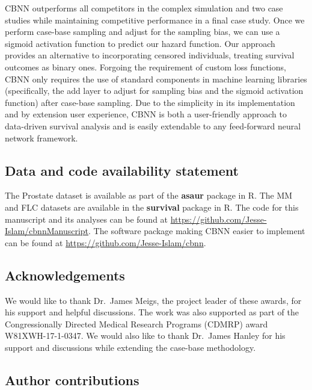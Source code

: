 \documentclass[APA,LATO1COL]{WileyNJD-v2}
\begin{document}
CBNN outperforms all competitors in the complex
simulation and two case studies while maintaining competitive performance in a final case study.
Once we perform case-base sampling and adjust for the sampling bias, we can use
a sigmoid activation function to predict our hazard function. Our
approach provides an alternative to incorporating censored individuals, treating
survival outcomes as binary ones. Forgoing the requirement
of custom loss functions, CBNN only requires the use of standard
components in machine learning libraries (specifically, the add layer to
adjust for sampling bias and the sigmoid activation function) after case-base sampling. Due to
the simplicity in its implementation and by extension user experience,
CBNN is both a user-friendly approach to data-driven survival analysis
and is easily extendable to any feed-forward neural network framework.


\hypertarget{data-and-code-availability-statement}{%
\subsection*{Data and code availability
statement}\label{data-and-code-availability-statement}}


The Prostate dataset is available as part of the \textbf{asaur} package in R.
The MM and FLC datasets are available in the \textbf{survival} package in R.
The code for this manuscript and its analyses can be found at
\url{https://github.com/Jesse-Islam/cbnnManuscript}. The software
package making CBNN easier to implement can be found at
\url{https://github.com/Jesse-Islam/cbnn}.

\hypertarget{acknowledgements}{%
\subsection*{Acknowledgements}\label{acknowledgements}}

We would like to thank Dr.~James Meigs, the project
leader of these awards, for his support and helpful discussions. The
work was also supported as part of the Congressionally Directed Medical
Research Programs (CDMRP) award W81XWH-17-1-0347. We would also like to
thank Dr.~James Hanley for his support and discussions while extending
the case-base methodology.

\subsection*{Author contributions}
\end{document}
